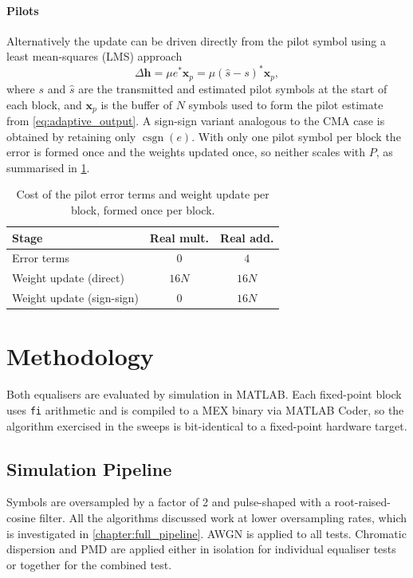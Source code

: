 \documentclass[12pt,a4paper]{article}
\begin{document}
\paragraph{Pilots}
Alternatively the update can be driven directly from the pilot symbol using a least mean-squares (LMS) approach \cite{Savory;08}
\begin{equation}
    \Delta \mathbf{h} = \mu e^* \mathbf{x}_p = \mu (\hat{s} - s)^* \mathbf{x}_p,
\end{equation}
where $s$ and $\hat{s}$ are the transmitted and estimated pilot symbols at the start of each block, and $\mathbf{x}_p$ is the buffer of $N$ symbols used to form the pilot estimate from \cref{eq:adaptive_output}. A sign-sign variant analogous to the CMA case is obtained by retaining only $\operatorname{csgn}(e)$. With only one pilot symbol per block the error is formed once and the weights updated once, so neither scales with $P$, as summarised in \cref{tab:adaptive_cost_pilot}.
\begin{table}[H]
    \centering
    \begin{tabular}{lcc}
        \toprule
        Stage & Real mult. & Real add. \\
        \midrule
        Error terms               & $0$    & $4$ \\
        Weight update (direct)    & $16N$  & $16N$ \\
        Weight update (sign-sign) & $0$    & $16N$ \\
        \bottomrule
    \end{tabular}
    \caption{Cost of the pilot error terms and weight update per block, formed once per block.}
    \label{tab:adaptive_cost_pilot}
\end{table}
\section{Methodology}
Both equalisers are evaluated by simulation in MATLAB. Each fixed-point block uses \texttt{fi} arithmetic and is compiled to a MEX binary via MATLAB Coder, so the algorithm exercised in the sweeps is bit-identical to a fixed-point hardware target.

\subsection{Simulation Pipeline}
Symbols are oversampled by a factor of 2 and pulse-shaped with a root-raised-cosine filter. All the algorithms discussed work at lower oversampling rates, which is investigated in \cref{chapter:full_pipeline}. AWGN is applied to all tests. Chromatic dispersion and PMD are applied either in isolation for individual equaliser tests or together for the combined test.
\end{document}
